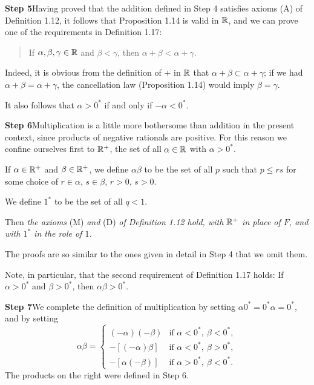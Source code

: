 \medskip
\noindent\textbf{Step 5}\quad Having proved that the addition defined in Step 4
satisfies axioms (A) of Definition 1.12, it follows that Proposition 1.14 is
valid in $\mathbb{R}$, and we can prove one of the requirements in Definition 1.17:
\begin{quote}
If $\alpha,\beta,\gamma \in \mathbb{R}$ and $\beta < \gamma$, then
$\alpha+\beta < \alpha+\gamma$.
\end{quote}
Indeed, it is obvious from the definition of $+$ in $\mathbb{R}$ that
$\alpha+\beta \subset \alpha+\gamma$; if we had $\alpha+\beta = \alpha+\gamma$,
the cancellation law (Proposition 1.14) would imply $\beta = \gamma$.

It also follows that $\alpha > 0^*$ if and only if $-\alpha < 0^*$.

\medskip
\noindent\textbf{Step 6}\quad Multiplication is a little more bothersome than
addition in the present context, since products of negative rationals are
positive. For this reason we confine ourselves first to $\mathbb{R}^+$, the set of all
$\alpha \in \mathbb{R}$ with $\alpha > 0^*$.

If $\alpha \in \mathbb{R}^+$ and $\beta \in \mathbb{R}^+$, we define $\alpha\beta$ to be the set
of all $p$ such that $p \le rs$ for some choice of $r \in \alpha$,
$s \in \beta$, $r>0$, $s>0$.

We define $1^*$ to be the set of all $q < 1$.

Then \emph{the axioms} (M) \emph{and} (D) \emph{of Definition 1.12 hold, with
$\mathbb{R}^+$ in place of $F$, and with $1^*$ in the role of $1$.}

The proofs are so similar to the ones given in detail in Step 4 that we omit
them.

Note, in particular, that the second requirement of Definition 1.17 holds: If
$\alpha > 0^*$ and $\beta > 0^*$, then $\alpha\beta > 0^*$.

\medskip
\noindent\textbf{Step 7}\quad We complete the definition of multiplication by
setting $\alpha 0^* = 0^*\alpha = 0^*$, and by setting
\[
  \alpha\beta = \begin{cases}
    (-\alpha)(-\beta) & \text{if } \alpha<0^*,\ \beta<0^*,\\
    -[(-\alpha)\beta] & \text{if } \alpha<0^*,\ \beta>0^*,\\
    -[\alpha(-\beta)] & \text{if } \alpha>0^*,\ \beta<0^*.
  \end{cases}
\]
The products on the right were defined in Step 6.

